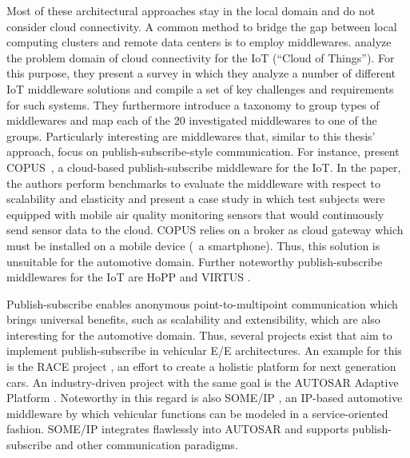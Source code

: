 Most of these architectural approaches stay in the local domain and do not consider cloud connectivity. A common method to bridge the gap between local computing clusters and remote data centers is to employ middlewares.
\citeauthor*{farahzadi2017middleware} analyze the problem domain of cloud connectivity for the IoT (``Cloud of Things'')\cite{farahzadi2017middleware}. For this purpose, they present a survey in which they analyze a number of different IoT middleware solutions and compile a set of key challenges and requirements for such systems. They furthermore introduce a taxonomy to group types of middlewares and map each of the 20 investigated middlewares to one of the groups. 
Particularly interesting are middlewares that, similar to this thesis' approach, focus on publish-subscribe-style communication.
For instance, \citeauthor*{antonic2016mobile} present COPUS~\cite{antonic2016mobile}, a cloud-based publish-subscribe middleware for the IoT. In the paper, the authors perform benchmarks to evaluate the middleware with respect to scalability and elasticity and present a case study in which test subjects were equipped with mobile air quality monitoring sensors that would continuously send sensor data to the cloud. COPUS relies on a broker as cloud gateway which must be installed on a mobile device (\eg\ a smartphone). Thus, this solution is unsuitable for the automotive domain.
Further noteworthy publish-subscribe middlewares for the IoT are HoPP \cite{gundougan2018hopp} and VIRTUS \cite{bazzani2012enabling}.

Publish-subscribe enables anonymous point-to-multipoint communication which brings universal benefits, such as scalability and extensibility, which are also interesting for the automotive domain.
Thus, several projects exist that aim to implement publish-subscribe in vehicular E/E architectures.
An example for this is the RACE project \cite{sommer2013race}, an effort to create a holistic platform for next generation cars.
An industry-driven project with the same goal is the AUTOSAR Adaptive Platform \cite{furst2016autosar}.
Noteworthy in this regard is also SOME/IP \cite{volker2013some}, an IP-based automotive middleware by which vehicular functions can be modeled in a service-oriented fashion. SOME/IP integrates flawlessly into AUTOSAR and supports publish-subscribe and other communication paradigms.

